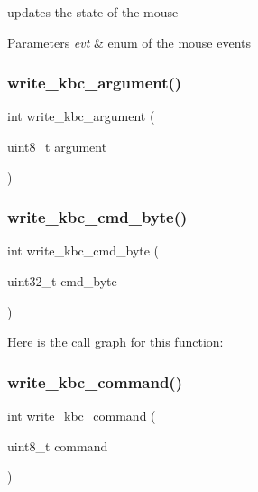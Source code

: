 updates the state of the mouse 


\begin{DoxyParams}{Parameters}
{\em evt} & enum of the mouse events \\
\hline
\end{DoxyParams}
\mbox{\label{group__mouse_gaa581647856759c0789e39e87beb056c0}} 
\subsubsection{\texorpdfstring{write\_kbc\_argument()}{write\_kbc\_argument()}}
{\footnotesize\ttfamily int write\+\_\+kbc\+\_\+argument (\begin{DoxyParamCaption}\item[{uint8\+\_\+t}]{argument }\end{DoxyParamCaption})}

\mbox{\label{group__mouse_gae71de5cc3d84045784f84fb32e0c4bd3}} 
\subsubsection{\texorpdfstring{write\_kbc\_cmd\_byte()}{write\_kbc\_cmd\_byte()}}
{\footnotesize\ttfamily int write\+\_\+kbc\+\_\+cmd\+\_\+byte (\begin{DoxyParamCaption}\item[{uint32\+\_\+t}]{cmd\+\_\+byte }\end{DoxyParamCaption})}

Here is the call graph for this function\+:
\mbox{\label{group__mouse_gac193b39c229dcec39b0d82bb9f242574}} 
\subsubsection{\texorpdfstring{write\_kbc\_command()}{write\_kbc\_command()}}
{\footnotesize\ttfamily int write\+\_\+kbc\+\_\+command (\begin{DoxyParamCaption}\item[{uint8\+\_\+t}]{command }\end{DoxyParamCaption})}



